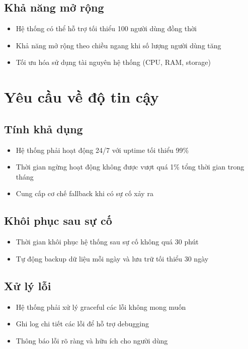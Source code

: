 \subsection{Khả năng mở rộng}
\begin{itemize}
  \item Hệ thống có thể hỗ trợ tối thiểu 100 người dùng đồng thời
  \item Khả năng mở rộng theo chiều ngang khi số lượng người dùng tăng
  \item Tối ưu hóa sử dụng tài nguyên hệ thống (CPU, RAM, storage)
\end{itemize}

\section{Yêu cầu về độ tin cậy}

\subsection{Tính khả dụng}
\begin{itemize}
  \item Hệ thống phải hoạt động 24/7 với uptime tối thiểu 99\%
  \item Thời gian ngừng hoạt động không được vượt quá 1\% tổng thời gian trong tháng
  \item Cung cấp cơ chế fallback khi có sự cố xảy ra
\end{itemize}

\subsection{Khôi phục sau sự cố}
\begin{itemize}
  \item Thời gian khôi phục hệ thống sau sự cố không quá 30 phút
  \item Tự động backup dữ liệu mỗi ngày và lưu trữ tối thiểu 30 ngày
\end{itemize}

\subsection{Xử lý lỗi}
\begin{itemize}
  \item Hệ thống phải xử lý graceful các lỗi không mong muốn
  \item Ghi log chi tiết các lỗi để hỗ trợ debugging
  \item Thông báo lỗi rõ ràng và hữu ích cho người dùng
\end{itemize}